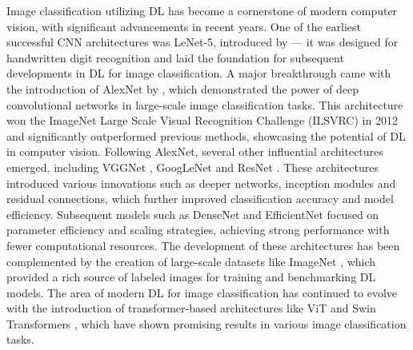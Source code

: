 Image classification utilizing \ac{DL} has become a cornerstone of modern computer vision, with significant advancements in recent years.
One of the earliest successful \ac{CNN} architectures was LeNet-5, introduced by \textcite{lecunGradientbasedLearningApplied1998} --- it was designed for handwritten digit recognition and laid the foundation for subsequent developments in \ac{DL} for image classification.
A major breakthrough came with the introduction of AlexNet by \textcite{krizhevskyImageNetClassificationDeep2012}, which demonstrated the power of deep convolutional networks in large-scale image classification tasks.
This architecture won the ImageNet Large Scale Visual Recognition Challenge (ILSVRC) in 2012 and significantly outperformed previous methods, showcasing the potential of \ac{DL} in computer vision.
Following AlexNet, several other influential architectures emerged, including VGGNet \autocite{simonyanVeryDeepConvolutional2015}, GoogLeNet \autocite{szegedyGoingDeeperConvolutions2015} and ResNet \autocite{heDeepResidualLearning2016}.
These architectures introduced various innovations such as deeper networks, inception modules and residual connections, which further improved classification accuracy and model efficiency.
Subsequent models such as DenseNet \autocite{huangDenselyConnectedConvolutional2017} and EfficientNet \autocite{tanEfficientNetRethinkingModel2019} focused on parameter efficiency and scaling strategies, achieving strong performance with fewer computational resources.
The development of these architectures has been complemented by the creation of large-scale datasets like ImageNet \autocite{dengImageNetLargescaleHierarchical2009}, which provided a rich source of labeled images for training and benchmarking \ac{DL} models.
The area of modern \ac{DL} for image classification has continued to evolve with the introduction of transformer-based architectures like \ac{ViT} \autocite{dosovitskiyImageWorth16x162021} and Swin Transformers \autocite{liuSwinTransformerHierarchical2021}, which have shown promising results in various image classification tasks.

